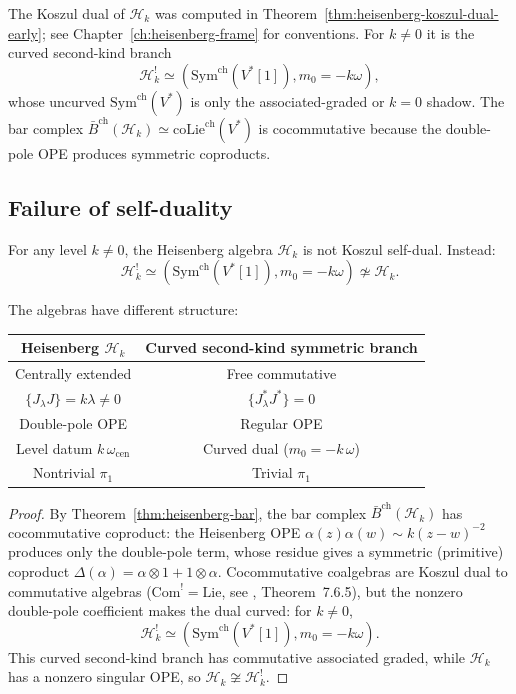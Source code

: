 The Koszul dual of $\mathcal{H}_k$ was computed in
Theorem~\ref{thm:heisenberg-koszul-dual-early}; see
Chapter~\ref{ch:heisenberg-frame}
for conventions. For $k\neq0$ it is the curved second-kind branch
\[
\mathcal{H}_k^! \simeq
(\mathrm{Sym}^{\mathrm{ch}}(V^*[1]),m_0=-k\omega),
\]
whose uncurved $\mathrm{Sym}^{\mathrm{ch}}(V^*)$ is only the
associated-graded or $k=0$ shadow. The bar complex
$\bar{B}^{\mathrm{ch}}(\mathcal{H}_k) \simeq
\mathrm{coLie}^{\mathrm{ch}}(V^*)$ is cocommutative because the
double-pole OPE produces symmetric coproducts.

\subsection{Failure of self-duality}

\begin{theorem}
\label{thm:heisenberg-not-self-dual}
For any level $k \neq 0$, the Heisenberg algebra $\mathcal{H}_k$ is not Koszul
self-dual. Instead:
\[
\mathcal H_k^!
\simeq(\mathrm{Sym}^{\mathrm{ch}}(V^*[1]),m_0=-k\omega)
\not\simeq \mathcal H_k .
\]

The algebras have different structure:
\begin{center}
\begin{tabular}{c|c}
\textbf{Heisenberg } $\mathcal{H}_k$ & \textbf{Curved second-kind symmetric branch} \\ \hline
Centrally extended & Free commutative \\
$\{J_\lambda J\} = k\lambda \neq 0$ & $\{J^*_\lambda J^*\} = 0$ \\
Double-pole OPE & Regular OPE \\
Level datum $k\,\omega_{\mathrm{cen}}$ & Curved dual ($m_0 = -k\,\omega$) \\
Nontrivial $\pi_1$ & Trivial $\pi_1$
\end{tabular}
\end{center}
\end{theorem}

\begin{proof}
By Theorem~\ref{thm:heisenberg-bar}, the bar complex
$\bar{B}^{\mathrm{ch}}(\mathcal{H}_k)$ has cocommutative coproduct:
the Heisenberg OPE $\alpha(z)\alpha(w) \sim k(z-w)^{-2}$ produces
only the double-pole term, whose residue gives a symmetric
(primitive) coproduct
$\Delta(\alpha) = \alpha \otimes 1 + 1 \otimes \alpha$.
Cocommutative coalgebras are Koszul dual to commutative algebras
($\mathrm{Com}^! = \mathrm{Lie}$, see \cite{LV12},
Theorem~7.6.5), but the nonzero double-pole coefficient makes the
dual curved: for $k\neq0$,
\[
\mathcal H_k^!
\simeq(\mathrm{Sym}^{\mathrm{ch}}(V^*[1]),m_0=-k\omega).
\]
This curved second-kind branch has commutative associated graded,
while $\mathcal{H}_k$ has a nonzero singular OPE, so
$\mathcal{H}_k \not\cong \mathcal{H}_k^!$.
\end{proof}

